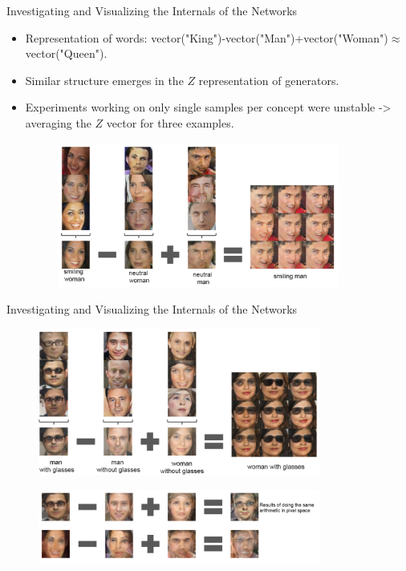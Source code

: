 \documentclass[10pt]{beamer}
\begin{document}
	\begin{frame}{Investigating and Visualizing the Internals of the Networks}
		\begin{itemize}
			\item Representation of words: vector("King")-vector("Man")+vector("Woman")$\approx$vector("Queen").
			\item Similar structure emerges in the $Z$ representation of generators.
			\item Experiments working on only single samples per concept were unstable -> averaging the $Z$ vector for three examples.
			\begin{figure}
				\includegraphics[width=25em]{figures/DCGAN-visualizing-internals-vector-1.PNG}
			\end{figure}
		\end{itemize}
	\end{frame}

	\begin{frame}{Investigating and Visualizing the Internals of the Networks}
		\begin{figure}
			\includegraphics[width=25em]{figures/DCGAN-visualizing-internals-vector-2.PNG}
		\end{figure}
		\begin{figure}
			\includegraphics[width=25em]{figures/DCGAN-visualizing-internals-vector-3.PNG}
		\end{figure}
	\end{frame}
\end{document}

